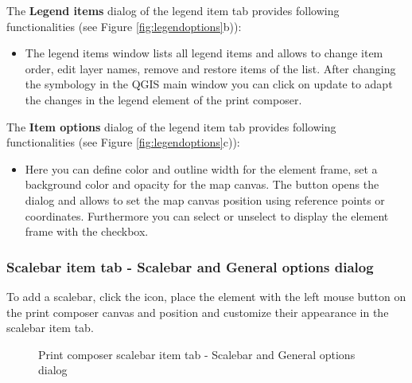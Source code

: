 
The \textbf{Legend items} dialog of the legend item tab provides following
functionalities (see Figure \ref{fig:legendoptions}b)):

\begin{itemize}
\item The legend items window lists all legend items and allows to change
item order, edit layer names, remove and restore items of the list. After
changing the symbology in the QGIS main window you can click on update to
adapt the changes in the legend element of the print composer.
\end{itemize}


The \textbf{Item options} dialog of the legend item tab provides following
functionalities (see Figure \ref{fig:legendoptions}c)):

\begin{itemize}
\item Here you can define color and outline width for the element frame, set
a background color and opacity for the map canvas. The 
button opens the  dialog and allows to set the map
canvas position using reference points or coordinates. Furthermore you can
select or unselect to display the element frame with the  checkbox.
\end{itemize}

\subsubsection{Scalebar item tab - Scalebar and General options dialog}

To add a scalebar, click the 
icon, place the element with the left mouse button on the print composer
canvas and position and customize their appearance in the scalebar item tab.

\begin{figure}[ht]
\centering
\caption{Print composer scalebar item tab - Scalebar and General options dialog \nixcaption}\label{fig:scalebaroptions}
\goodgap
{}
\end{figure}

